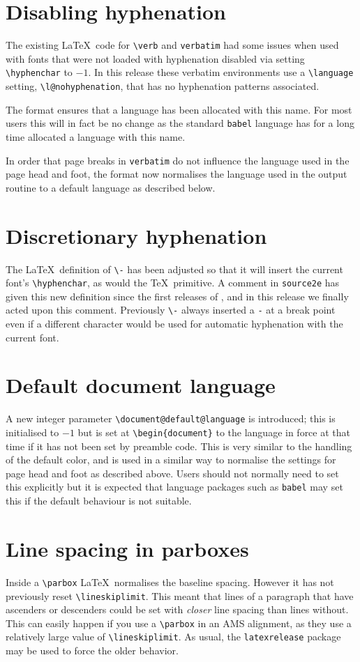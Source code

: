 \documentclass{ltnews}
\providecommand\pkg[1]{\texttt{#1}}
\providecommand\env[1]{\texttt{#1}}
\providecommand\file[1]{\texttt{#1}}
\begin{document}
\section{Disabling hyphenation}
The existing \LaTeX\ code for \verb|\verb| and \verb|verbatim| had some
issues when used with fonts that were not loaded with hyphenation
disabled via setting \verb|\hyphenchar| to $-1$. In this release these
verbatim environments use a \verb|\language| setting,
\verb|\l@nohyphenation|, that has no hyphenation patterns associated.

The format ensures that  a language has been allocated with this name.
For most users this will in fact be no change as the standard
\pkg{babel} language has for a long time allocated a language with
this name.

In order that page breaks in \env{verbatim} do not influence the
language used in the page head and foot, the format now normalises the
language used in the output routine to a default language as described
below.

\section{Discretionary hyphenation}
The \LaTeX\ definition of \verb|\-| has been adjusted so that it will
insert the current font's \verb|\hyphenchar|, as would the
\TeX\ primitive. A comment in \file{source2e} has given
this new definition since the first releases of \LaTeXe, and in this
release we finally acted upon this comment. Previously \verb|\-|
always inserted a \texttt{-} at a break point even if a different
character would be used for automatic hyphenation with the current font.

\section{Default document language}

A new integer parameter \verb|\document@default@language| is
introduced; this is initialised to $-1$ but is set at
\verb|\begin{document}| to the language in force at that time if it
  has not been set by preamble code. This is very similar to the
  handling of the default color, and is used in a similar way to
  normalise the settings for page head and foot as described above.
Users should not normally need to set this explicitly but it is expected that
language packages such as \pkg{babel} may set this if the default
behaviour is not suitable.

\section{Line spacing in parboxes}
Inside a \verb|\parbox|
\LaTeX\ normalises the baseline spacing. However it has not
previously reset \verb|\lineskiplimit|. This meant that
lines of a paragraph that have ascenders or descenders could be set
with \emph{closer} line spacing than lines without. This can easily
happen if you use a \verb|\parbox| in an AMS alignment, as they use a
relatively large value of \verb|\lineskiplimit|.
As usual, the \pkg{latexrelease} package may be used to
force the older behavior.
\end{document}
